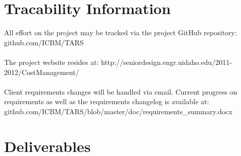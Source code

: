 \documentclass[letterpaper]{article}
\begin{document}
\section{Tracability Information}
All effort on the project may be tracked via the project GitHub repository: github.com/ICBM/TARS\\
\\
The project website resides at: http://seniordesign.engr.uidaho.edu/2011-2012/CostManagement/\\
\\ 
Client requirements changes will be handled via email. Current progress on requirements as well as the requirements changelog is available at: github.com/ICBM/TARS/blob/master/doc/requirements\_summary.docx\\

\section{Deliverables}
\end{document}
